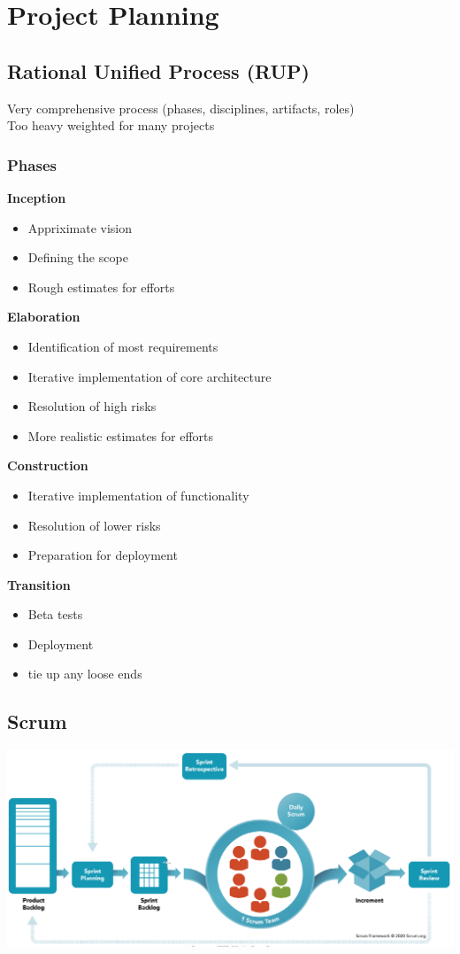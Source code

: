 
\section{Project Planning}
\subsection{Rational Unified Process (RUP)}
Very comprehensive process (phases, disciplines, artifacts, roles)\\
Too heavy weighted for many projects
\subsubsection{Phases}
\textbf{Inception}
\begin{itemize}
    \item Appriximate vision
    \item Defining the scope
    \item Rough estimates for efforts
\end{itemize}
\textbf{Elaboration}
\begin{itemize}
    \item Identification of most requirements
    \item Iterative implementation of core architecture
    \item Resolution of high risks
    \item More realistic estimates for efforts
\end{itemize}
\textbf{Construction}
\begin{itemize}
    \item Iterative implementation of functionality
    \item Resolution of lower risks
    \item Preparation for deployment
\end{itemize}
\textbf{Transition}
\begin{itemize}
    \item Beta tests
    \item Deployment
    \item tie up any loose ends
\end{itemize}

\subsection{Scrum}
\includegraphics[width=\linewidth]{../img/scrum_overview.png}
